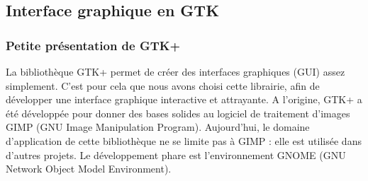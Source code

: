 \documentclass[a4paper,12pt]{article}
\begin{document}
	\subsection{Interface graphique en GTK}

		\subsubsection{Petite présentation de GTK+}
La bibliothèque GTK+ permet de créer des interfaces graphiques (GUI) assez
simplement. C'est pour cela que nous avons choisi cette librairie, afin de
développer une interface graphique interactive et attrayante. A l'origine, GTK+
a été développée pour donner des bases solides au logiciel de traitement
d'images GIMP (GNU Image Manipulation Program). Aujourd'hui, le domaine
d'application de cette bibliothèque ne se limite pas à GIMP : elle est utilisée
dans d'autres projets. Le développement phare est l'environnement  GNOME (GNU
Network Object Model Environment).
\end{document}
